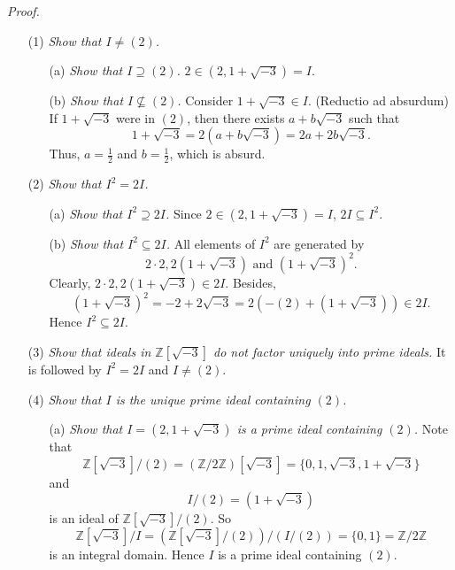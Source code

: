 \documentclass{article}
\begin{document}
\emph{Proof.}
\begin{enumerate}
\item[(1)]
  \emph{Show that $I \neq (2)$.}
    \begin{enumerate}
    \item[(a)]
      \emph{Show that $I \supseteq (2)$.}
      $2 \in (2,1+\sqrt{-3}) = I$.
      
    \item[(b)]
      \emph{Show that $I \not\subseteq (2)$.}
      Consider $1+\sqrt{-3} \in I$.
      (Reductio ad absurdum)
      If $1+\sqrt{-3}$ were in $(2)$, then there exists $a+b\sqrt{-3}$ such that
        $$1+\sqrt{-3} = 2(a+b\sqrt{-3}) = 2a+2b\sqrt{-3}.$$
      Thus, $a = \frac{1}{2}$ and $b = \frac{1}{2}$, which is absurd.
    \end{enumerate}

\item[(2)]
\emph{Show that $I^2 = 2I$.}
  \begin{enumerate}
  \item[(a)]
    \emph{Show that $I^2 \supseteq 2I$.}
    Since $2 \in (2,1+\sqrt{-3}) = I$, $2I \subseteq I^2$.
  
  \item[(b)]
    \emph{Show that $I^2 \subseteq 2I$.}
    All elements of $I^2$ are generated by
    $$2 \cdot 2, 2(1+\sqrt{-3}) \text{ and } (1+\sqrt{-3})^2.$$
    Clearly, $2 \cdot 2, 2(1+\sqrt{-3}) \in 2I$.
    Besides,
    $$(1+\sqrt{-3})^2 = -2 + 2\sqrt{-3} = 2(-(2) + (1+\sqrt{-3})) \in 2I.$$
    Hence $I^2 \subseteq 2I$.
  \end{enumerate}

\item[(3)]
\emph{Show that ideals in $\mathbb{Z}[\sqrt{-3}]$ do not factor uniquely
into prime ideals.}
  It is followed by $I^2 = 2I$ and $I \neq (2)$.

\item[(4)]
\emph{Show that $I$ is the unique prime ideal containing $(2)$.}
  \begin{enumerate}
  \item[(a)]
    \emph{Show that $I = (2, 1+\sqrt{-3})$ is a prime ideal containing $(2)$.}
    Note that
    \[
      \mathbb{Z}[\sqrt{-3}]/(2)
      = (\mathbb{Z}/2\mathbb{Z})[\sqrt{-3}]
      = \{ 0, 1, \sqrt{-3}, 1+\sqrt{-3} \}
    \]
    and
    \[
      I/(2) = (1+\sqrt{-3})
    \]
    is an ideal of $\mathbb{Z}[\sqrt{-3}]/(2)$.
    So
    \[
      \mathbb{Z}[\sqrt{-3}]/I
      = (\mathbb{Z}[\sqrt{-3}]/(2)) / (I/(2))
      = \{ 0,1 \}
      = \mathbb{Z}/2\mathbb{Z}
    \]
    is an integral domain.
    Hence $I$ is a prime ideal containing $(2)$.


\end{enumerate}
\end{enumerate}
\end{document}
